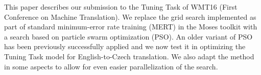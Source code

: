 This paper describes our submission to the Tuning Task of WMT16 (First Conference on Machine Translation). We replace the grid search implemented as part of standard minimum-error rate training (MERT) in the Moses toolkit with a search based on particle swarm optimization (PSO). An older variant of PSO has been previously successfully applied and we now test it in optimizing the Tuning Task model for English-to-Czech translation. We also adapt the method in some aspects to allow for even easier parallelization of the search.
